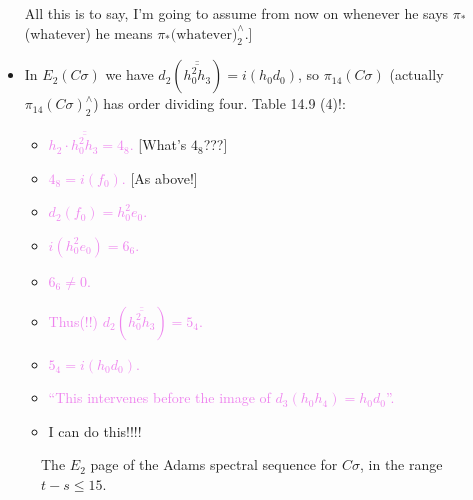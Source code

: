 \documentclass{MetricNotes2023}
\def\textcolour{\textcolor}
\begin{document}
\begin{itemize}
All this is to say, I'm going to assume from now on whenever he says \(\pi_*\)(whatever) he means \(\pi_*\text{(whatever)}^\wedge_2\).]

\item In \(E_2(C \sigma)\) we have \(d_2(\overline{\overline{h_0^2h_3}})=i(h_0d_0)\), so \(\pi_{14}(C \sigma)\) (actually \(\pi_{14}(C \sigma)^\wedge_2\)) has order dividing four. Table 14.9 (4)!: \begin{itemize}
\item \textcolour{violet}{\(h_2 \cdot \overline{\overline{h_0^2h_3}}=4_8\).} [What's \(4_8\)???]
\item \textcolour{violet}{\(4_8=i(f_0)\).} [As above!]
\item \textcolour{violet}{\(d_2(f_0)=h_0^2e_0\).}
\item \textcolour{violet}{\(i(h_0^2e_0)=6_6\).}
\item \textcolour{violet}{\(6_6\neq 0\).}
\item \textcolour{violet}{Thus(!!) \(d_2(\overline{\overline{h_0^2h_3}})=5_4\).}
\item \textcolour{violet}{\(5_4=i(h_0d_0)\).}
\item \textcolour{violet}{``This intervenes before the image of \(d_3(h_0h_4)=h_0d_0\)''. }
\item I can do this!!!!
\end{itemize}
\end{itemize}

\begin{figure}[H]
\centering

\caption{The \(E_2\) page of the Adams spectral sequence for \(C \sigma\), in the range \(t-s\leq 15\).}
\end{figure}
\end{document}
